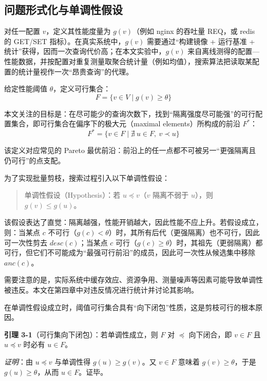 \documentclass[UTF8,a4paper,12pt]{ctexart}
\numberwithin{equation}{section}
\begin{document}
\subsection{问题形式化与单调性假设}

对任一配置 \(v\)，定义其性能度量为 \(g(v)\)（例如 nginx 的吞吐量 REQ，或
redis 的 GET/SET 指标）。在真实系统中，\(g(v)\) 需要通过``构建镜像 +
运行基准 + 统计''获得，因而一次查询代价高；在本文实验中，\(g(v)\)
来自离线测得的配置---性能数据，并按配置对重复测量取聚合统计量（例如均值），搜索算法把读取某配置的统计量视作一次``昂贵查询''的代理。

给定性能阈值 \(\theta\)，定义可行集合：
\begin{equation}
F = \{ v \in V \mid g(v) \ge \theta \}
\end{equation}

本文关注的目标是：在尽可能少的查询次数下，找到``隔离强度尽可能强''的可行配置集合，即可行集合在偏序下的极大元（maximal
elements）所构成的前沿 \(F^*\)：
\begin{equation}
F^* = \{v\in F\mid \nexists\ u\in F,\ v\prec u\}
\end{equation}

该定义对应常见的 Pareto
最优前沿：前沿上的任一点都不可被另一``更强隔离且仍可行''的点支配。

为了实现批量剪枝，搜索过程引入以下单调性假设：
\begin{quote}
单调性假设（Hypothesis）：若 \(u \preceq v\)（\(v\) 隔离不弱于
\(u\)），则 \(g(v) \le g(u)\)。
\end{quote}

该假设表达了直觉：隔离越强，性能开销越大，因此性能不应上升。若假设成立，则：当某点 \(c\)
不可行（\(g(c)<\theta\)）时，其所有后代（更强隔离）也不可行，因此可一次性剪去
\(desc(c)\)；当某点 \(c\)
可行（\(g(c)\ge\theta\)）时，其祖先（更弱隔离）都可行，但它们不可能成为``最强可行前沿''的成员，因此可一次性从候选集中移除
\(anc(c)\)。

需要注意的是，实际系统中缓存效应、资源争用、测量噪声等因素可能导致单调性被违反。本文在第四章中对违反情况进行统计并讨论其影响。

在单调性假设成立时，阈值可行集合具有``向下闭包''性质，这是剪枝可行的根本原因。

\textbf{引理 3-1}（可行集向下闭包）：若单调性成立，则 \(F\) 对
\(\preceq\) 向下闭合，即 \(v\in F\) 且 \(u\preceq v\) 时必有
\(u\in F\)。

\emph{证明}：由 \(u\preceq v\) 与单调性得 \(g(u)\ge g(v)\)。又
\(v\in F\) 意味着 \(g(v)\ge \theta\)，于是 \(g(u)\ge \theta\)，从而
\(u\in F\)。证毕。
\end{document}
